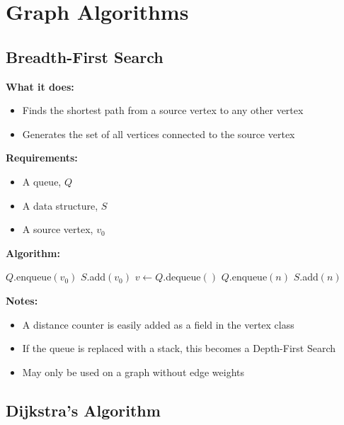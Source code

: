 \section{Graph Algorithms}

\subsection{Breadth-First Search}

\textbf{What it does:}
\begin{itemize}
    \item Finds the shortest path from a source vertex to any other vertex
    \item Generates the set of all vertices connected to the source vertex
\end{itemize}
\textbf{Requirements:}
\begin{itemize}
    \item A queue, $Q$
    \item A data structure, $S$
    \item A source vertex, $v_0$
\end{itemize}
\textbf{Algorithm:}
\begin{algorithmic}[1]
    \STATE $Q$.enqueue$(v_0)$
    \STATE $S$.add$(v_0)$
        \STATE $v \gets Q$.dequeue$()$
                \STATE $Q$.enqueue$(n)$
                \STATE $S$.add$(n)$
            \ENDIF
        \ENDFOR
    \ENDWHILE
\end{algorithmic}
\textbf{Notes:}
\begin{itemize}
    \item A distance counter is easily added as a field in the vertex class
    \item If the queue is replaced with a stack, this becomes a Depth-First Search
    \item May only be used on a graph without edge weights
\end{itemize}

\subsection{Dijkstra's Algorithm}

